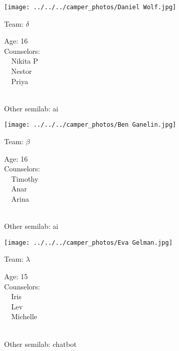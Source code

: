 \documentclass[10pt,letterpaper, landscape]{article}
\begin{document}
\horizontalshiftfornextsticker
\renewcommand{\baselinestretch}{1} \begin{sticker}
\noindent\begin{minipage}{0.5\textwidth}\texttt{[image: ../../../camper\_photos/Daniel Wolf.jpg]}\end{minipage}\begin{minipage}{0.45\textwidth}
Team: {\Large $\delta$}

Age:        16\\
Counselors: \\\ \ Nikita P\\\ \ Nestor\\\ \ Priya\\
\end{minipage} \\ \vspace{0.07in}
Other semilab: ai
\end{sticker}
\verticalshiftfornextsticker
\renewcommand{\baselinestretch}{1} \begin{sticker}
\noindent\begin{minipage}{0.5\textwidth}\texttt{[image: ../../../camper\_photos/Ben Ganelin.jpg]}\end{minipage}\begin{minipage}{0.45\textwidth}
Team: {\Large $\beta$}

Age:        16\\
Counselors: \\\ \ Timothy\\\ \ Anar\\\ \ Arina\\
\end{minipage} \\ \vspace{0.07in}
Other semilab: ai
\end{sticker}
\horizontalshiftfornextsticker
\renewcommand{\baselinestretch}{1} \begin{sticker}
\noindent\begin{minipage}{0.5\textwidth}\texttt{[image: ../../../camper\_photos/Eva Gelman.jpg]}\end{minipage}\begin{minipage}{0.45\textwidth}
Team: {\Large $\lambda$}

Age:        15\\
Counselors: \\\ \ Iris\\\ \ Lev\\\ \ Michelle\\
\end{minipage} \\ \vspace{0.07in}
Other semilab: chatbot
\end{sticker}
\end{document}
